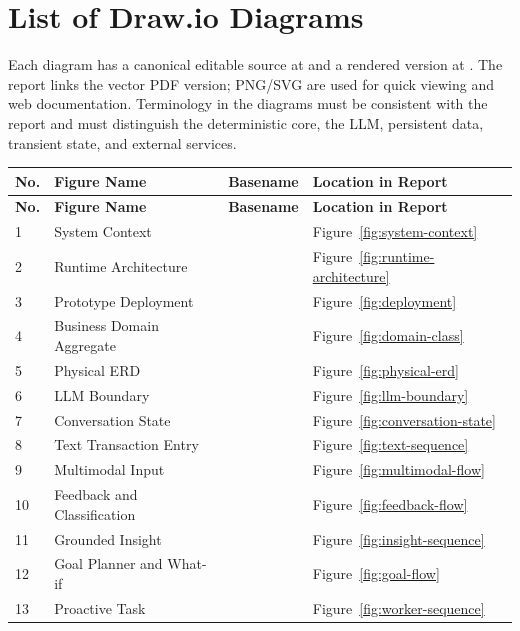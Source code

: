 \appendix

\chapter{List of Draw.io Diagrams}

Each diagram has a canonical editable source at  and a rendered version at . The report links the vector PDF version; PNG/SVG are used for quick viewing and web documentation. Terminology in the diagrams must be consistent with the report and must distinguish the deterministic core, the LLM, persistent data, transient state, and external services.

\begin{longtable}{@{}C{1.0cm}L{4.2cm}L{4.5cm}L{3.0cm}@{}}
  \toprule
  \textbf{No.} & \textbf{Figure Name} & \textbf{Basename} & \textbf{Location in Report} \\
  \midrule
  \endfirsthead
  \toprule
  \textbf{No.} & \textbf{Figure Name} & \textbf{Basename} & \textbf{Location in Report} \\
  \midrule
   & System Context &  & Figure~\ref{fig:system-context} \\
  2 & Runtime Architecture &  & Figure~\ref{fig:runtime-architecture} \\
  3 & Prototype Deployment &  & Figure~\ref{fig:deployment} \\
  4 & Business Domain Aggregate &  & Figure~\ref{fig:domain-class} \\
  5 & Physical ERD &  & Figure~\ref{fig:physical-erd} \\
  6 & LLM Boundary &  & Figure~\ref{fig:llm-boundary} \\
  7 & Conversation State &  & Figure~\ref{fig:conversation-state} \\
  8 & Text Transaction Entry &  & Figure~\ref{fig:text-sequence} \\
  9 & Multimodal Input &  & Figure~\ref{fig:multimodal-flow} \\
  10 & Feedback and Classification &  & Figure~\ref{fig:feedback-flow} \\
  11 & Grounded Insight &  & Figure~\ref{fig:insight-sequence} \\
  12 & Goal Planner and What-if &  & Figure~\ref{fig:goal-flow} \\
  13 & Proactive Task &  & Figure~\ref{fig:worker-sequence} \\
  \bottomrule
\end{longtable}

